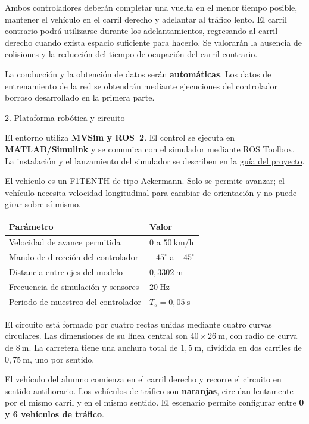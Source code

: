 \documentclass[11pt,a4paper]{article}
\newcommand{\problem}[1]{%
  \par\addvspace{4.2mm}%
  {\rmfamily\fontsize{16}{18}\selectfont\color{headingblue}#1\par}%
  \nobreak\vspace{1.6mm}\nobreak
}
\begin{document}
Ambos controladores deberán completar una vuelta en el menor tiempo posible,
mantener el vehículo en el carril derecho y adelantar al tráfico lento.
El carril contrario podrá utilizarse durante los adelantamientos, regresando
al carril derecho cuando exista espacio suficiente para hacerlo.
Se valorarán la ausencia de colisiones y la reducción del tiempo de ocupación
del carril contrario.

La conducción y la obtención de datos serán \textbf{automáticas}.
Los datos de entrenamiento de la red se obtendrán mediante ejecuciones del
controlador borroso desarrollado en la primera parte.

\problem{2. Plataforma robótica y circuito}

El entorno utiliza \textbf{MVSim y ROS~2}. El control se ejecuta en
\textbf{MATLAB/Simulink} y se comunica con el simulador mediante ROS Toolbox.
La instalación y el lanzamiento del simulador se describen en la
\href{https://robesafe-uah.github.io/sci_practica_final/}{guía del proyecto}.

El vehículo es un F1TENTH de tipo Ackermann. Solo se permite avanzar;
el vehículo necesita velocidad longitudinal para cambiar de orientación
y no puede girar sobre sí mismo.

\begin{center}
\begin{tabularx}{0.94\textwidth}{@{}X l@{}}
\toprule
\textbf{Parámetro} & \textbf{Valor}\\
\midrule
Velocidad de avance permitida & $0$ a $50\ \mathrm{km/h}$\\
Mando de dirección del controlador & $-45^\circ$ a $+45^\circ$\\
Distancia entre ejes del modelo & $0{,}3302\ \mathrm{m}$\\
Frecuencia de simulación y sensores & $20\ \mathrm{Hz}$\\
Periodo de muestreo del controlador & $T_s=0{,}05\ \mathrm{s}$\\
\bottomrule
\end{tabularx}
\end{center}

El circuito está formado por cuatro rectas unidas mediante cuatro curvas
circulares. Las dimensiones de su línea central son
\textbf{$40\times26\ \mathrm{m}$}, con radio de curva de
\textbf{$8\ \mathrm{m}$}. La carretera tiene una anchura total de
\textbf{$1{,}5\ \mathrm{m}$}, dividida en dos carriles de
\textbf{$0{,}75\ \mathrm{m}$}, uno por sentido.

El vehículo del alumno comienza en el carril derecho y recorre el circuito
en sentido antihorario. Los vehículos de tráfico son \textbf{naranjas},
circulan lentamente por el mismo carril y en el mismo sentido.
El escenario permite configurar entre \textbf{0 y 6 vehículos de tráfico}.
\end{document}
